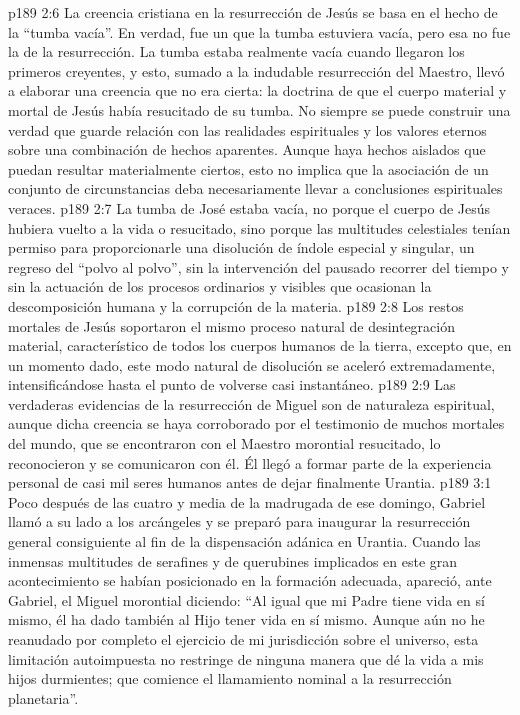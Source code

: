 \vs p189 2:6 \pc La creencia cristiana en la resurrección de Jesús se basa en el hecho de la “tumba vacía”. En verdad, fue un  que la tumba estuviera vacía, pero esa no fue la  de la resurrección. La tumba estaba realmente vacía cuando llegaron los primeros creyentes, y esto, sumado a la indudable resurrección del Maestro, llevó a elaborar una creencia que no era cierta: la doctrina de que el cuerpo material y mortal de Jesús había resucitado de su tumba. No siempre se puede construir una verdad que guarde relación con las realidades espirituales y los valores eternos sobre una combinación de hechos aparentes. Aunque haya hechos aislados que puedan resultar materialmente ciertos, esto no implica que la asociación de un conjunto de circunstancias deba necesariamente llevar a conclusiones espirituales veraces.
\vs p189 2:7 La tumba de José estaba vacía, no porque el cuerpo de Jesús hubiera vuelto a la vida o resucitado, sino porque las multitudes celestiales tenían permiso para proporcionarle una disolución de índole especial y singular, un regreso del “polvo al polvo”, sin la intervención del pausado recorrer del tiempo y sin la actuación de los procesos ordinarios y visibles que ocasionan la descomposición humana y la corrupción de la materia.
\vs p189 2:8 Los restos mortales de Jesús soportaron el mismo proceso natural de desintegración material, característico de todos los cuerpos humanos de la tierra, excepto que, en un momento dado, este modo natural de disolución se aceleró extremadamente, intensificándose hasta el punto de volverse casi instantáneo.
\vs p189 2:9 Las verdaderas evidencias de la resurrección de Miguel son de naturaleza espiritual, aunque dicha creencia se haya corroborado por el testimonio de muchos mortales del mundo, que se encontraron con el Maestro morontial resucitado, lo reconocieron y se comunicaron con él. Él llegó a formar parte de la experiencia personal de casi mil seres humanos antes de dejar finalmente Urantia.
\vs p189 3:1 Poco después de las cuatro y media de la madrugada de ese domingo, Gabriel llamó a su lado a los arcángeles y se preparó para inaugurar la resurrección general consiguiente al fin de la dispensación adánica en Urantia. Cuando las inmensas multitudes de serafines y de querubines implicados en este gran acontecimiento se habían posicionado en la formación adecuada, apareció, ante Gabriel, el Miguel morontial diciendo: “Al igual que mi Padre tiene vida en sí mismo, él ha dado también al Hijo tener vida en sí mismo. Aunque aún no he reanudado por completo el ejercicio de mi jurisdicción sobre el universo, esta limitación autoimpuesta no restringe de ninguna manera que dé la vida a mis hijos durmientes; que comience el llamamiento nominal a la resurrección planetaria”.
